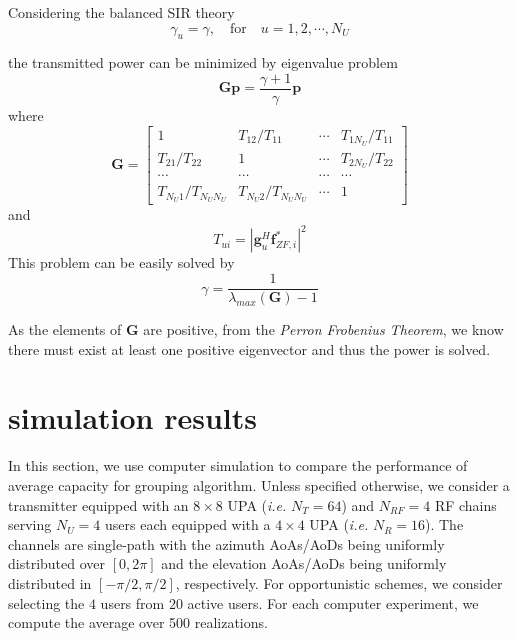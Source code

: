 \documentclass[conference]{IEEEtran}
\begin{document}
Considering the balanced SIR theory 
\begin{equation}
\gamma_u=\gamma,\quad\text{for}\quad u=1,2,\cdots,N_U
\end{equation}

the transmitted power can be minimized by eigenvalue problem
\begin{equation}
\bm{Gp} = \frac{\gamma+1}{\gamma} \bm{p}
\end{equation}
where 
\begin{equation}
\bm{G}=
\begin{bmatrix}
1&T_{12}/T_{11}&\cdots&T_{1N_U}/T_{11}\\
T_{21}/T_{22}&1&\cdots&T_{2N_U}/T_{22}\\
\cdots&\cdots&\cdots&\cdots\\
T_{N_U1}/T_{N_UN_U}&T_{N_U2}/T_{N_UN_U}&\cdots&1
\end{bmatrix}
\end{equation}
and
\begin{equation}
T_{ui} = |\bm{g}_u^H \bm{f}^*_{ZF,i}|^2
\end{equation}
This problem can be easily solved by 
\begin{equation}
\gamma = \frac{1}{\lambda_{max}(\bm{G})-1}  
\end{equation}

As the elements of $\bm{G}$ are positive, from the \textit{Perron Frobenius Theorem}, we know there must exist at least one positive eigenvector and thus the power is solved.
	
	
\section{simulation results}
In this section, we use computer simulation to compare the performance of average capacity for grouping algorithm. Unless specified otherwise, we consider a transmitter equipped with an $8\times 8$ UPA ({\em i.e.} $N_T=64$) and $N_{RF}=4$ RF chains serving $N_U=4$ users each equipped with a $4\times 4$ UPA ({\em i.e.} $N_R=16$). The channels are single-path with the azimuth AoAs/AoDs being uniformly distributed over $[0, 2\pi]$ and the elevation AoAs/AoDs being uniformly distributed in $[-\pi/2, \pi/2]$, respectively. For opportunistic schemes, we consider selecting the $4$ users from $20$ active users. For each computer experiment, we compute the average over 500 realizations.
\end{document}
